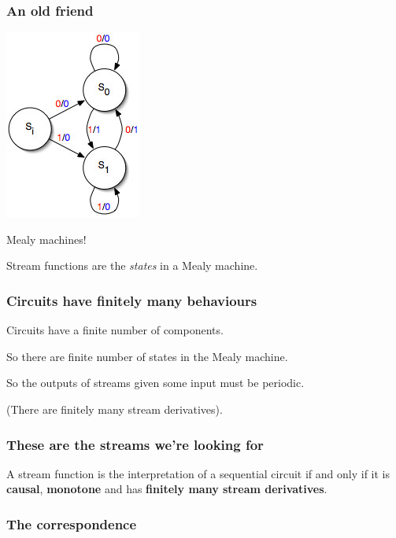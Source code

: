 \begin{frame}
    \frametitle{An old friend}

    \Large

    \begin{center}
        \includegraphics[scale=0.5]{imgs/mealy-machine}

        Mealy machines!

        \pause

        \normalsize
        Stream functions are the \emph{states} in a Mealy machine.
    \end{center}

\end{frame}
\begin{frame}
    \frametitle{Circuits have finitely many behaviours}

    Circuits have a finite number of components.

    \pause

    So there are finite number of states in the Mealy machine.

    \pause

    So the outputs of streams given some input must be \alert{periodic}.

    \pause

    (There are finitely many \alert{stream derivatives}).
\end{frame}
\begin{frame}
    \frametitle{These are the streams we're looking for}

    \begin{theorem}
        A stream function is the interpretation of a sequential circuit
        if and only if it is \textbf{causal}, \textbf{monotone} and has
        \textbf{finitely many stream derivatives}.
    \end{theorem}
\end{frame}
\begin{frame}
    \frametitle{The correspondence}

    \centering
    \Large

\end{frame}